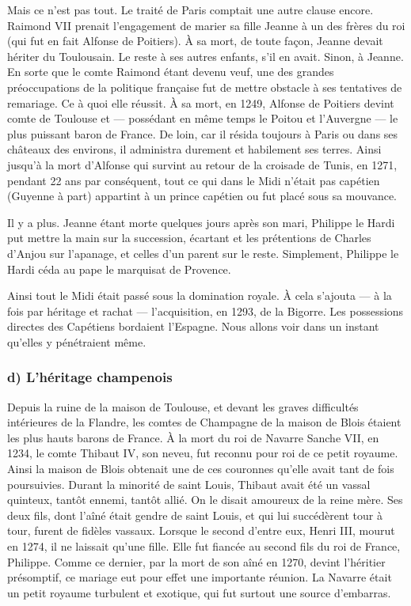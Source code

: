 \documentclass[french,twoside]{book} %
\begin{document}
Mais ce n’est pas tout. Le traité de Paris comptait une autre clause encore. Raimond VII prenait l’engagement de marier sa fille Jeanne à un des frères du roi (qui fut en fait Alfonse de Poitiers). À sa mort, de toute façon, Jeanne devait hériter du Toulousain. Le reste à ses autres enfants, s’il en avait. Sinon, à Jeanne. En sorte que le comte Raimond étant devenu veuf, une des grandes préoccupations de la politique française fut de mettre obstacle à ses tentatives de remariage. Ce à quoi elle réussit. À sa mort, en 1249, Alfonse de Poitiers devint comte de Toulouse et — possédant en même temps le Poitou et l’Auvergne — le plus puissant baron de France. De loin, car il résida toujours à Paris ou dans ses châteaux des environs, il administra durement et habilement ses terres. Ainsi jusqu’à la mort d’Alfonse qui survint au retour de la croisade de Tunis, en 1271, pendant 22 ans par conséquent, tout ce qui dans le Midi n’était pas capétien (Guyenne à part) appartint à un prince capétien ou fut placé sous sa mouvance.\par
Il y a plus. Jeanne étant morte quelques jours après son mari, Philippe le Hardi put mettre la main sur la succession, écartant et les prétentions de Charles d’Anjou sur l’apanage, et celles d’un parent sur le reste. Simplement, Philippe le Hardi céda au pape le marquisat de Provence.\par
Ainsi tout le Midi était passé sous la domination royale. À cela s’ajouta — à la fois par héritage et rachat — l’acquisition, en 1293, de la Bigorre. Les possessions directes des Capétiens bordaient l’Espagne. Nous allons voir dans un instant qu’elles y pénétraient même.
\subsubsection[d) L’héritage champenois]{d) L’héritage champenois}
\noindent Depuis la ruine de la maison de Toulouse, et devant les graves difficultés intérieures de la Flandre, les comtes de Champagne de la maison de Blois étaient les plus hauts barons de France. À la mort du roi de Navarre Sanche VII, en 1234, le comte Thibaut IV, son neveu, fut reconnu pour roi de ce petit royaume. Ainsi la maison de Blois obtenait une de ces couronnes qu’elle avait tant de fois poursuivies. Durant la minorité de saint Louis, Thibaut avait été un vassal quinteux, tantôt ennemi, tantôt allié. On le disait amoureux de la reine mère. Ses deux fils, dont l’aîné était gendre de saint Louis, et qui lui succédèrent tour à tour, furent de fidèles vassaux. Lorsque le second d’entre eux, Henri III, mourut en 1274, il ne laissait qu’une fille. Elle fut fiancée au second fils du roi de France, Philippe. Comme ce dernier, par la mort de son aîné en 1270, devint l’héritier présomptif, ce mariage eut pour effet une importante réunion. La Navarre était un petit royaume turbulent et exotique, qui fut surtout une source d’embarras.\par
\end{document}
